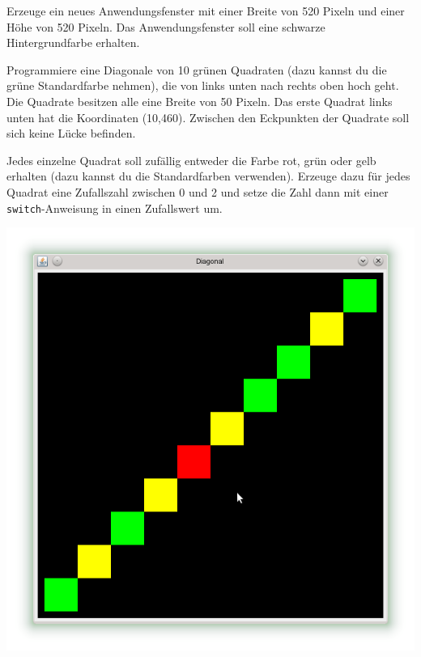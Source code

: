 \begin{minipage}{0.5\textwidth}
\begin{compactenum}[a)]
\item Erzeuge ein neues Anwendungsfenster mit einer Breite von 520 Pixeln und
einer Höhe von 520 Pixeln. Das Anwendungsfenster soll eine schwarze
Hintergrundfarbe erhalten.
\item Programmiere eine Diagonale von 10 grünen Quadraten (dazu kannst du die
grüne Standardfarbe nehmen), die von links unten nach rechts oben hoch geht. Die
Quadrate besitzen alle eine Breite von 50 Pixeln. Das erste Quadrat links unten
hat die Koordinaten (10,460). Zwischen den Eckpunkten der Quadrate soll sich
keine Lücke befinden.
\item Jedes einzelne Quadrat soll zufällig entweder die Farbe rot, grün oder
gelb erhalten (dazu kannst du die Standardfarben verwenden). Erzeuge dazu für
jedes Quadrat eine Zufallszahl zwischen 0 und 2 und setze die Zahl dann mit
einer \lstinline|switch|-Anweisung in einen Zufallswert um.
\end{compactenum}
\end{minipage}\hfill
\begin{minipage}{0.45\textwidth}
\centering
\includegraphics[width=1.0\textwidth]{./inf/SEKII/09_Java_Farben_und_Zufall/Aufgabe3.png}
\end{minipage}


